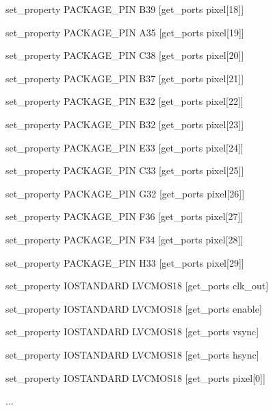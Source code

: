 {set\_property PACKAGE\_PIN B39 [get\_ports {pixel[18]}]

set\_property PACKAGE\_PIN A35 [get\_ports {pixel[19]}]

set\_property PACKAGE\_PIN C38 [get\_ports {pixel[20]}]

set\_property PACKAGE\_PIN B37 [get\_ports {pixel[21]}]

set\_property PACKAGE\_PIN E32 [get\_ports {pixel[22]}]

set\_property PACKAGE\_PIN B32 [get\_ports {pixel[23]}]

set\_property PACKAGE\_PIN E33 [get\_ports {pixel[24]}]

set\_property PACKAGE\_PIN C33 [get\_ports {pixel[25]}]

set\_property PACKAGE\_PIN G32 [get\_ports {pixel[26]}]

set\_property PACKAGE\_PIN F36 [get\_ports {pixel[27]}]

set\_property PACKAGE\_PIN F34 [get\_ports {pixel[28]}]

set\_property PACKAGE\_PIN H33 [get\_ports {pixel[29]}]

set\_property IOSTANDARD LVCMOS18 [get\_ports clk\_out]

set\_property IOSTANDARD LVCMOS18 [get\_ports enable]

set\_property IOSTANDARD LVCMOS18 [get\_ports vsync]

set\_property IOSTANDARD LVCMOS18 [get\_ports hsync]

set\_property IOSTANDARD LVCMOS18 [get\_ports {pixel[0]}]

...

}
